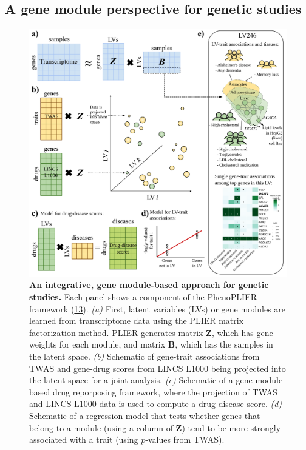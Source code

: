 \hypertarget{a-gene-module-perspective-for-genetic-studies}{%
\subsection{A gene module perspective for genetic studies}\label{a-gene-module-perspective-for-genetic-studies}}

\begin{figure}
\hypertarget{fig:fig4}{%
\centering
\includegraphics[width=1\textwidth,height=\textheight]{images/fig4.svg}
\caption{\textbf{An integrative, gene module-based approach for genetic studies.}
Each panel shows a component of the PhenoPLIER framework (\protect\hyperlink{ref-NM3rHx1i}{13}).
\emph{(a)} First, latent variables (LVs) or gene modules are learned from transcriptome data using the PLIER matrix factorization method.
PLIER generates matrix \(\mathbf{Z}\), which has gene weights for each module, and matrix \(\mathbf{B}\), which has the samples in the latent space.
\emph{(b)} Schematic of gene-trait associations from TWAS and gene-drug scores from LINCS L1000 being projected into the latent space for a joint analysis.
\emph{(c)} Schematic of a gene module-based drug reporposing framework, where the projection of TWAS and LINCS L1000 data is used to compute a drug-disease score.
\emph{(d)} Schematic of a regression model that tests whether genes that belong to a module (using a column of \(\mathbf{Z}\)) tend to be more strongly associated with a trait (using \(p\)-values from TWAS).
}}
\end{figure}
